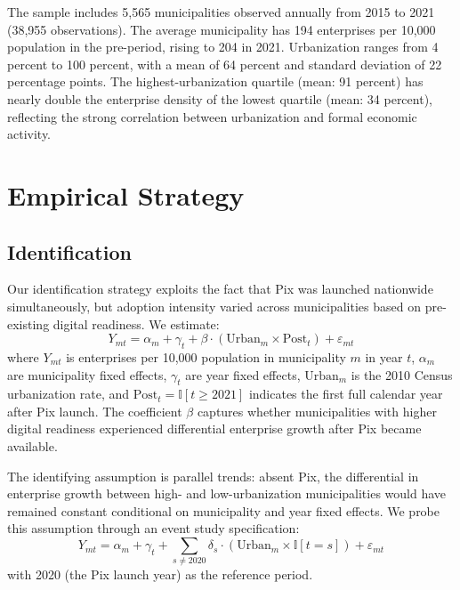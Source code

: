\documentclass[12pt]{article}
\newcommand{\ind}{\mathbb{I}}
\begin{document}
The sample includes 5,565 municipalities observed annually from 2015 to 2021 (38,955 observations). The average municipality has 194 enterprises per 10,000 population in the pre-period, rising to 204 in 2021. Urbanization ranges from 4 percent to 100 percent, with a mean of 64 percent and standard deviation of 22 percentage points. The highest-urbanization quartile (mean: 91 percent) has nearly double the enterprise density of the lowest quartile (mean: 34 percent), reflecting the strong correlation between urbanization and formal economic activity.

\section{Empirical Strategy}

\subsection{Identification}

Our identification strategy exploits the fact that Pix was launched nationwide simultaneously, but adoption intensity varied across municipalities based on pre-existing digital readiness. We estimate:
\begin{equation}
Y_{mt} = \alpha_m + \gamma_t + \beta \cdot (\text{Urban}_m \times \text{Post}_t) + \varepsilon_{mt}
\label{eq:main}
\end{equation}
where $Y_{mt}$ is enterprises per 10,000 population in municipality $m$ in year $t$, $\alpha_m$ are municipality fixed effects, $\gamma_t$ are year fixed effects, $\text{Urban}_m$ is the 2010 Census urbanization rate, and $\text{Post}_t = \ind[t \geq 2021]$ indicates the first full calendar year after Pix launch. The coefficient $\beta$ captures whether municipalities with higher digital readiness experienced differential enterprise growth after Pix became available.

The identifying assumption is parallel trends: absent Pix, the differential in enterprise growth between high- and low-urbanization municipalities would have remained constant conditional on municipality and year fixed effects. We probe this assumption through an event study specification:
\begin{equation}
Y_{mt} = \alpha_m + \gamma_t + \sum_{s \neq 2020} \delta_s \cdot (\text{Urban}_m \times \ind[t = s]) + \varepsilon_{mt}
\label{eq:event}
\end{equation}
with 2020 (the Pix launch year) as the reference period.
\end{document}

